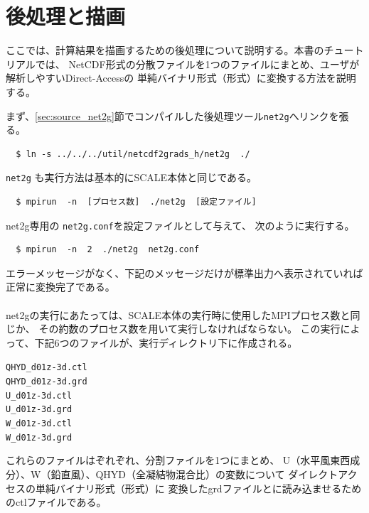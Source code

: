 \section{後処理と描画} \label{sec:ideal_exp_net2g}
ここでは、計算結果を描画するための後処理について説明する。本書のチュートリアルでは、
NetCDF形式の分散ファイルを1つのファイルにまとめ、ユーザが解析しやすいDirect-Accessの
単純バイナリ形式（\grads 形式）に変換する方法を説明する。

まず、\ref{sec:source_net2g}節でコンパイルした後処理ツール\verb|net2g|へリンクを張る。
\begin{verbatim}
  $ ln -s ../../../util/netcdf2grads_h/net2g  ./
\end{verbatim}

\verb|net2g| も実行方法は基本的にSCALE本体と同じである。
\begin{verbatim}
  $ mpirun  -n  [プロセス数]  ./net2g  [設定ファイル]
\end{verbatim}
net2g専用の \verb|net2g.conf|を設定ファイルとして与えて、
次のように実行する。
\begin{verbatim}
  $ mpirun  -n  2  ./net2g  net2g.conf
\end{verbatim}
エラーメッセージがなく、下記のメッセージだけが標準出力へ表示されていれば正常に変換完了である。\\

\\

\noindent net2gの実行にあたっては、SCALE本体の実行時に使用したMPIプロセス数と同じか、
その約数のプロセス数を用いて実行しなければならない。
この実行によって、下記6つのファイルが、実行ディレクトリ下に作成される。
\begin{alltt}
  QHYD_d01z-3d.ctl
  QHYD_d01z-3d.grd
  U_d01z-3d.ctl
  U_d01z-3d.grd
  W_d01z-3d.ctl
  W_d01z-3d.grd
\end{alltt}
これらのファイルはぞれぞれ、分割ファイルを1つにまとめ、
U（水平風東西成分）、W（鉛直風）、QHYD（全凝結物混合比）の変数について
ダイレクトアクセスの単純バイナリ形式（\grads 形式）に
変換したgrdファイルと\grads に読み込ませるためのctlファイルである。

